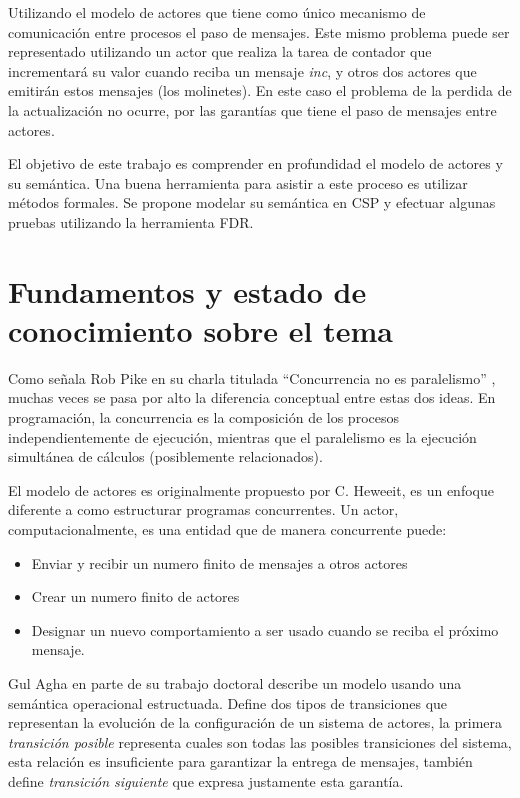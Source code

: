 \documentclass{article}
\begin{document}
Utilizando el modelo de actores que tiene como único mecanismo de comunicación entre procesos el paso de mensajes. Este mismo problema puede ser representado utilizando un actor que realiza la tarea de contador que incrementará su valor cuando reciba un mensaje \emph{inc}, y otros dos actores que emitirán estos mensajes (los molinetes). En este caso el problema de la perdida de la actualización no ocurre, por las garantías que tiene el paso de mensajes entre actores. 

El objetivo de este trabajo es comprender en profundidad el modelo de actores y su semántica. Una buena herramienta para asistir a este proceso es utilizar métodos formales. Se propone modelar su semántica en CSP y efectuar algunas pruebas utilizando la herramienta FDR\cite{fdr}.


\section{Fundamentos y estado de conocimiento sobre el tema}
 
Como señala Rob Pike en su charla titulada ``Concurrencia no es paralelismo'' \cite{rpike13_cnp}, muchas veces se pasa por alto la diferencia conceptual entre estas dos ideas. En programación, la concurrencia es la composición de los procesos independientemente de ejecución, mientras que el paralelismo es la ejecución simultánea de cálculos (posiblemente relacionados). 

El modelo de actores es originalmente propuesto por C. Heweeit\cite{Wyatt:2013:AC:2663429}, es un enfoque diferente a como estructurar programas concurrentes. Un actor, computacionalmente, es una entidad que de manera concurrente puede:

\begin{itemize}
\item Enviar y recibir un numero finito de mensajes a otros actores
\item Crear un numero finito de actores
\item Designar un nuevo comportamiento a ser usado cuando se reciba el próximo mensaje.
\end{itemize}

Gul Agha\cite{Agha:1986:AMC:7929} en parte de su trabajo doctoral describe un modelo usando una semántica operacional estructuada\cite{Plotkin81astructural}. Define dos tipos de transiciones que representan la evolución de la configuración de un sistema de actores, la primera \emph{transición posible} representa cuales son todas las posibles transiciones del sistema, esta relación es insuficiente para garantizar la entrega de mensajes, también define \emph{transición siguiente} que expresa justamente esta garantía.
\end{document}
